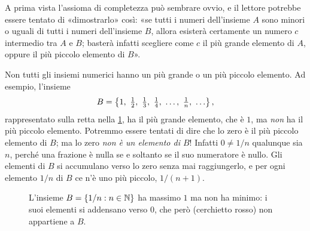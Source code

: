 \begin{marginfigure}
\centering
{}
\caption{L'assioma di completezza: se ogni elemento di $A$ precede ogni elemento di $B$,
esiste un «separatore» $c$.}
\label{fig:completezza}
\end{marginfigure}

A prima vista l'assioma di completezza può sembrare ovvio, e il lettore potrebbe essere
tentato di «dimostrarlo» così: «se tutti i numeri dell'insieme $A$ sono minori o uguali
di tutti i numeri dell'insieme $B$, allora esisterà certamente un numero $c$
intermedio tra $A$ e $B$; basterà infatti scegliere come $c$ il più grande elemento di
$A$, oppure il più piccolo elemento di $B$».

\begin{attenzione}
Non tutti gli insiemi numerici hanno un più grande o un più piccolo elemento. Ad
esempio, l'insieme
\[
  B=\set{1,\ \tfrac12,\ \tfrac13,\ \tfrac14,\ \dots,\ \tfrac1n,\ \dots},
\]
rappresentato sulla retta nella \cref{fig:insieme-1-su-n}, ha il più grande elemento,
che è $1$, ma \emph{non} ha il più piccolo elemento. Potremmo essere tentati di dire
che lo zero è il più piccolo elemento di $B$; ma lo zero \emph{non è un elemento di
$B$}! Infatti $0\neq 1/n$ qualunque sia $n$, perché una frazione è nulla se e soltanto
se il suo numeratore è nullo. Gli elementi di $B$ si accumulano verso lo zero senza
mai raggiungerlo, e per ogni elemento $1/n$ di $B$ ce n'è uno più piccolo,
$1/(n+1)$.
\end{attenzione}

\begin{figure}[htb]
\centering
{}
\caption{L'insieme $B=\{1/n : n\in\mathbb{N}\}$ ha massimo $1$ ma non ha minimo: i suoi
elementi si addensano verso $0$, che però (cerchietto rosso) non appartiene a $B$.}
\label{fig:insieme-1-su-n}
\end{figure}


